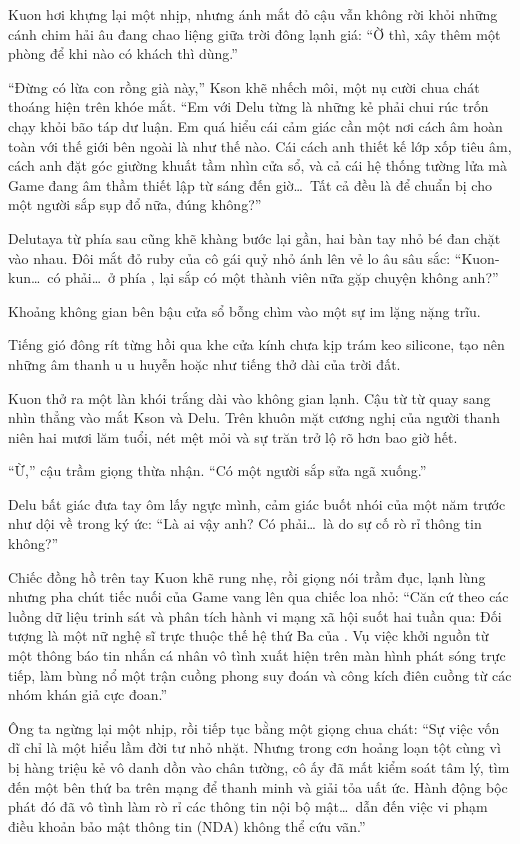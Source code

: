 ﻿\documentclass[../main.tex]{subfiles}
\begin{document}
Kuon hơi khựng lại một nhịp, nhưng ánh mắt đỏ cậu vẫn không rời khỏi những cánh chim hải âu đang chao liệng giữa trời đông lạnh giá: ``Ờ thì, xây thêm một phòng để khi nào có khách thì dùng.''

``Đừng có lừa con rồng già này,'' Kson khẽ nhếch môi, một nụ cười chua chát thoáng hiện trên khóe mắt. ``Em với Delu từng là những kẻ phải chui rúc trốn chạy khỏi bão táp dư luận. Em quá hiểu cái cảm giác cần một nơi cách âm hoàn toàn với thế giới bên ngoài là như thế nào. Cái cách anh thiết kế lớp xốp tiêu âm, cách anh đặt góc giường khuất tầm nhìn cửa sổ, và cả cái hệ thống tường lửa mà Game đang âm thầm thiết lập từ sáng đến giờ\dots\ Tất cả đều là để chuẩn bị cho một người sắp sụp đổ nữa, đúng không?''

Delutaya từ phía sau cũng khẽ khàng bước lại gần, hai bàn tay nhỏ bé đan chặt vào nhau. Đôi mắt đỏ ruby của cô gái quỷ nhỏ ánh lên vẻ lo âu sâu sắc: ``Kuon-kun\dots\ có phải\dots\ ở phía \hll, lại sắp có một thành viên nữa gặp chuyện không anh?''

Khoảng không gian bên bậu cửa sổ bỗng chìm vào một sự im lặng nặng trĩu.

Tiếng gió đông rít từng hồi qua khe cửa kính chưa kịp trám keo silicone, tạo nên những âm thanh u u huyễn hoặc như tiếng thở dài của trời đất.

Kuon thở ra một làn khói trắng dài vào không gian lạnh. Cậu từ từ quay sang nhìn thẳng vào mắt Kson và Delu. Trên khuôn mặt cương nghị của người thanh niên hai mươi lăm tuổi, nét mệt mỏi và sự trăn trở lộ rõ hơn bao giờ hết.

``Ừ,'' cậu trầm giọng thừa nhận. ``Có một người sắp sửa ngã xuống.''

Delu bất giác đưa tay ôm lấy ngực mình, cảm giác buốt nhói của một năm trước như dội về trong ký ức: ``Là ai vậy anh? Có phải\dots\ là do sự cố rò rỉ thông tin không?''

Chiếc đồng hồ trên tay Kuon khẽ rung nhẹ, rồi giọng nói trầm đục, lạnh lùng nhưng pha chút tiếc nuối của Game vang lên qua chiếc loa nhỏ: ``Căn cứ theo các luồng dữ liệu trinh sát và phân tích hành vi mạng xã hội suốt hai tuần qua: Đối tượng là một nữ nghệ sĩ trực thuộc thế hệ thứ Ba của \hll. Vụ việc khởi nguồn từ một thông báo tin nhắn cá nhân vô tình xuất hiện trên màn hình phát sóng trực tiếp, làm bùng nổ một trận cuồng phong suy đoán và công kích điên cuồng từ các nhóm khán giả cực đoan.''

Ông ta ngừng lại một nhịp, rồi tiếp tục bằng một giọng chua chát: ``Sự việc vốn dĩ chỉ là một hiểu lầm đời tư nhỏ nhặt. Nhưng trong cơn hoảng loạn tột cùng vì bị hàng triệu kẻ vô danh dồn vào chân tường, cô ấy đã mất kiểm soát tâm lý, tìm đến một bên thứ ba trên mạng để thanh minh và giải tỏa uất ức. Hành động bộc phát đó đã vô tình làm rò rỉ các thông tin nội bộ mật\dots\ dẫn đến việc vi phạm điều khoản bảo mật thông tin (NDA) không thể cứu vãn.''
\end{document}
